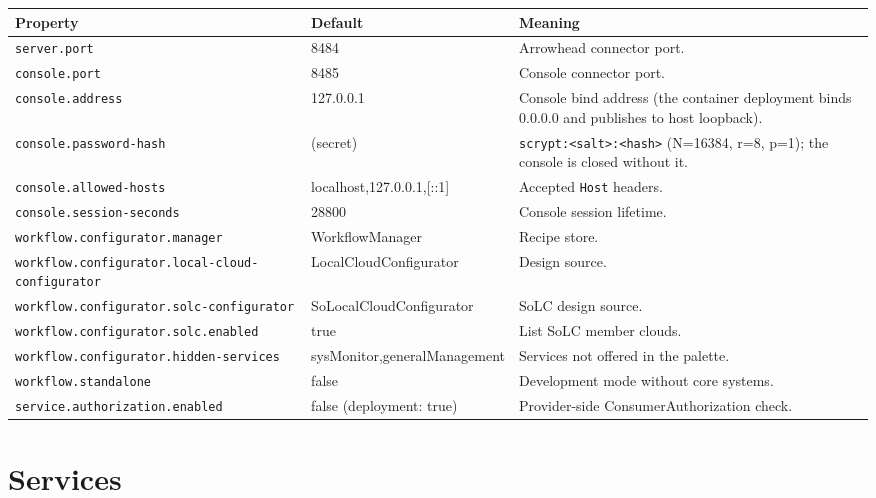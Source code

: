 \documentclass[a4paper]{arrowhead}
\begin{document}
{\small
\begin{longtable}{|p{5.6cm}|p{3.4cm}|p{6.8cm}|}

\hline
\rowcolor{gray!33} Property & Default & Meaning \\ \hline
\endhead
\texttt{server.\allowbreak{}port} & 8484 & Arrowhead connector port. \\ \hline
\texttt{console.\allowbreak{}port} & 8485 & Console connector port. \\ \hline
\texttt{console.\allowbreak{}address} & 127.0.0.1 & Console bind address (the container deployment binds 0.0.0.0 and publishes to host loopback). \\ \hline
\texttt{console.\allowbreak{}password-\allowbreak{}hash} & (secret) & \texttt{scrypt:<salt>:<hash>} (N=16384, r=8, p=1); the console is closed without it. \\ \hline
\texttt{console.\allowbreak{}allowed-\allowbreak{}hosts} & localhost,127.0.0.1,[::1] & Accepted \texttt{Host} headers. \\ \hline
\texttt{console.\allowbreak{}session-\allowbreak{}seconds} & 28800 & Console session lifetime. \\ \hline
\texttt{workflow.\allowbreak{}configurator.\allowbreak{}manager} & WorkflowManager & Recipe store. \\ \hline
\texttt{workflow.\allowbreak{}configurator.\allowbreak{}local-\allowbreak{}cloud-\allowbreak{}configurator} & LocalCloudConfigurator & Design source. \\ \hline
\texttt{workflow.\allowbreak{}configurator.\allowbreak{}solc-\allowbreak{}configurator} & SoLocalCloudConfigurator & SoLC design source. \\ \hline
\texttt{workflow.\allowbreak{}configurator.\allowbreak{}solc.\allowbreak{}enabled} & true & List SoLC member clouds. \\ \hline
\texttt{workflow.\allowbreak{}configurator.\allowbreak{}hidden-\allowbreak{}services} & sysMonitor,generalManagement & Services not offered in the palette. \\ \hline
\texttt{workflow.\allowbreak{}standalone} & false & Development mode without core systems. \\ \hline
\texttt{service.\allowbreak{}authorization.\allowbreak{}enabled} & false (deployment: true) & Provider-side ConsumerAuthorization check. \\ \hline
\end{longtable}
}


\newpage
\section{Services}
\label{sec:services}
\end{document}
